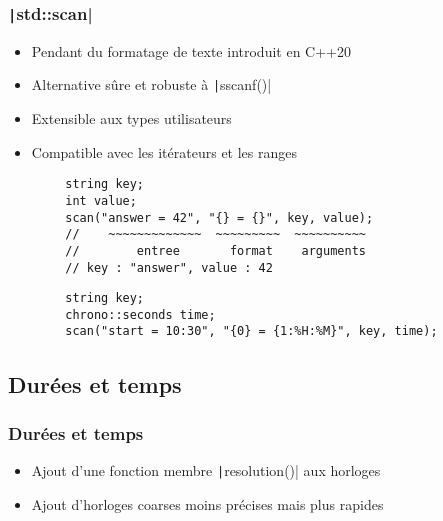\documentclass[C++.tex]{subfiles}
\begin{document}
\begin{frame}[fragile]
	\frametitle{\texttt|std::scan|}
	\begin{itemize}
		\item Pendant du formatage de texte introduit en C++20
		\item Alternative sûre et robuste à \texttt|sscanf()|
		\item Extensible aux types utilisateurs
		\item Compatible avec les itérateurs et les ranges
	\end{itemize}

	\begin{verbatim}
		string key;
		int value;
		scan("answer = 42", "{} = {}", key, value);
		//    ~~~~~~~~~~~~~  ~~~~~~~~~  ~~~~~~~~~~
		//        entree       format    arguments
		// key : "answer", value : 42
	\end{verbatim}

	\begin{verbatim}
		string key;
		chrono::seconds time;
		scan("start = 10:30", "{0} = {1:%H:%M}", key, time);
	\end{verbatim}
\end{frame}

\subsection*{Durées et temps}
\begin{frame}[fragile]
	\frametitle{Durées et temps}
	\begin{itemize}
		\item Ajout d'une fonction membre \texttt|resolution()| aux horloges
		\item Ajout d'horloges \og{}coarses\fg{} moins précises mais plus rapides
	\end{itemize}

\end{frame}
\end{document}
